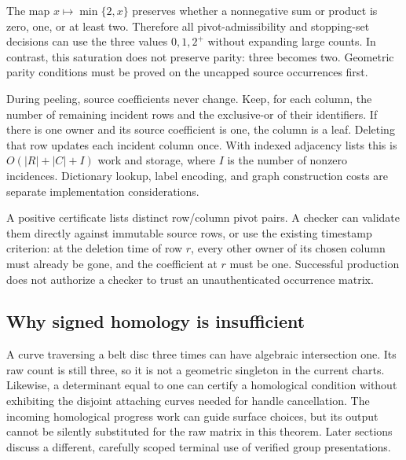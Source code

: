 The map $x\mapsto\min\{2,x\}$ preserves whether a nonnegative sum or
product is zero, one, or at least two.  Therefore all pivot-admissibility
and stopping-set decisions can use the three values $0,1,2^+$ without
expanding large counts.  In contrast, this saturation does not preserve
parity: three becomes two.  Geometric parity conditions must be proved on
the uncapped source occurrences first.

During peeling, source coefficients never change.  Keep, for each column,
the number of remaining incident rows and the exclusive-or of their
identifiers.  If there is one owner and its source coefficient is one,
the column is a leaf.  Deleting that row updates each incident column
once.  With indexed adjacency lists this is
$O(|R|+|C|+I)$ work and storage, where $I$ is the number of nonzero
incidences.  Dictionary lookup, label encoding, and graph construction
costs are separate implementation considerations.

A positive certificate lists distinct row/column pivot pairs.  A checker
can validate them directly against immutable source rows, or use the
existing timestamp criterion: at the deletion time of row $r$, every
other owner of its chosen column must already be gone, and the coefficient
at $r$ must be one.  Successful production does not authorize a checker
to trust an unauthenticated occurrence matrix.

\subsection{Why signed homology is insufficient}

A curve traversing a belt disc three times can have algebraic intersection
one.  Its raw count is still three, so it is not a geometric singleton in
the current charts.  Likewise, a determinant equal to one can certify a
homological condition without exhibiting the disjoint attaching curves
needed for handle cancellation.  The incoming homological progress work
can guide surface choices, but its output cannot be silently substituted
for the raw matrix in this theorem.  Later sections discuss a different,
carefully scoped terminal use of verified group presentations.
